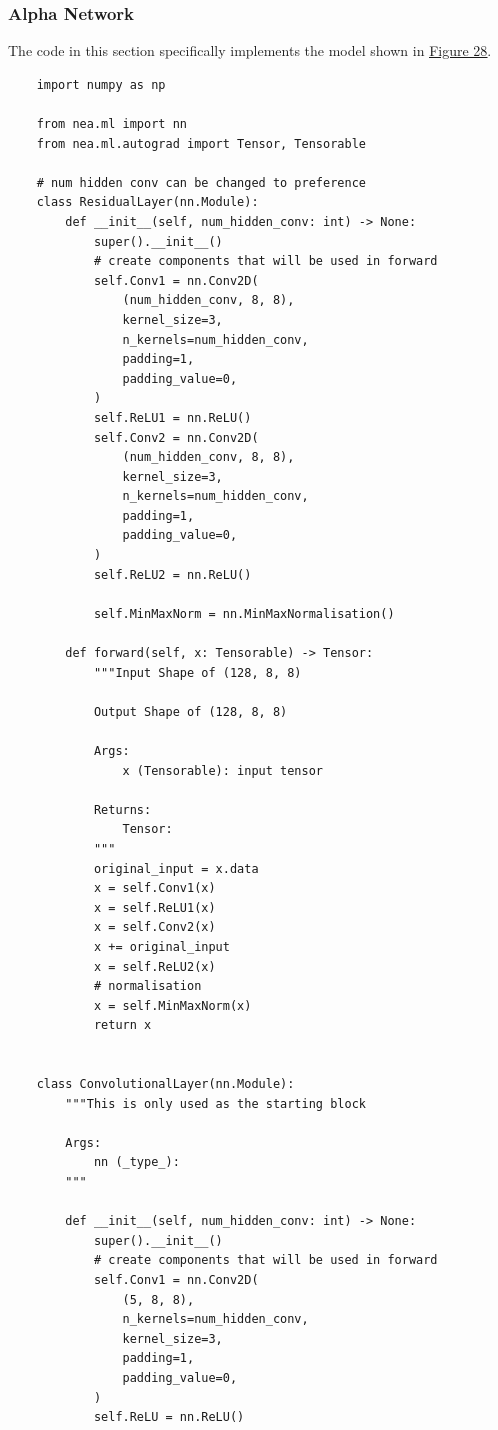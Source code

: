 \documentclass{article}
\begin{document}
    \subsubsection{Alpha Network}
    The code in this section specifically implements the model shown in \hyperlink{page.38}{\underline{Figure 28}}.
    \begin{verbatim}
    import numpy as np

    from nea.ml import nn
    from nea.ml.autograd import Tensor, Tensorable
    
    # num hidden conv can be changed to preference
    class ResidualLayer(nn.Module):
        def __init__(self, num_hidden_conv: int) -> None:
            super().__init__()
            # create components that will be used in forward
            self.Conv1 = nn.Conv2D(
                (num_hidden_conv, 8, 8),
                kernel_size=3,
                n_kernels=num_hidden_conv,
                padding=1,
                padding_value=0,
            )
            self.ReLU1 = nn.ReLU()
            self.Conv2 = nn.Conv2D(
                (num_hidden_conv, 8, 8),
                kernel_size=3,
                n_kernels=num_hidden_conv,
                padding=1,
                padding_value=0,
            )
            self.ReLU2 = nn.ReLU()

            self.MinMaxNorm = nn.MinMaxNormalisation()

        def forward(self, x: Tensorable) -> Tensor:
            """Input Shape of (128, 8, 8)

            Output Shape of (128, 8, 8)

            Args:
                x (Tensorable): input tensor

            Returns:
                Tensor:
            """
            original_input = x.data
            x = self.Conv1(x)
            x = self.ReLU1(x)
            x = self.Conv2(x)
            x += original_input
            x = self.ReLU2(x)
            # normalisation
            x = self.MinMaxNorm(x)            
            return x


    class ConvolutionalLayer(nn.Module):
        """This is only used as the starting block

        Args:
            nn (_type_):
        """

        def __init__(self, num_hidden_conv: int) -> None:
            super().__init__()
            # create components that will be used in forward
            self.Conv1 = nn.Conv2D(
                (5, 8, 8),
                n_kernels=num_hidden_conv,
                kernel_size=3,
                padding=1,
                padding_value=0,
            )
            self.ReLU = nn.ReLU()


\end{verbatim}
\end{document}
